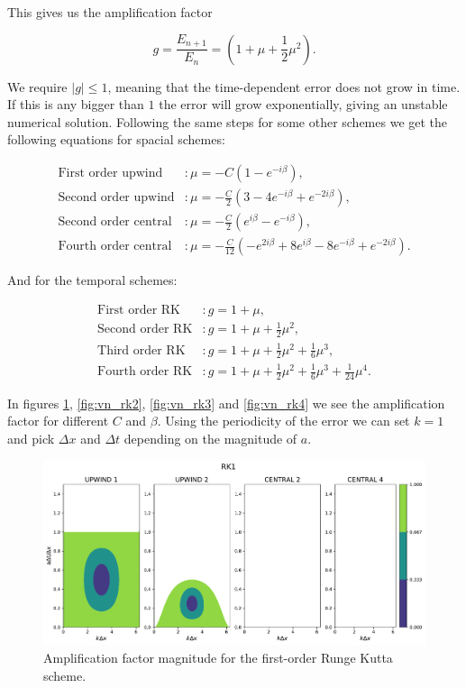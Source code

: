 \documentclass{article}
\begin{document}
This gives us the amplification factor 

\begin{equation}
    g = \frac{E_{n+1}}{E_n} = \left( 1 + \mu + \frac{1}{2}\mu^2  \right).
\end{equation}

We require $|g|\leq 1$, meaning that the time-dependent error does not grow in time. If this is any bigger than $1$ the error will grow exponentially, giving an unstable numerical solution. Following the same steps for some other schemes we get the following equations for spacial schemes:

\begin{align*}
    \text{First order upwind} &: \mu=-C\left(1-e^{-i\beta}\right),\\
    \text{Second order upwind} &: \mu=-\frac{C}{2}\left(3-4e^{-i\beta}+e^{-2i\beta}\right),\\
    \text{Second order central} &: \mu = -\frac{C}{2}\left(e^{i\beta} - e^{-i\beta}\right),\\
    \text{Fourth order central} &: \mu = - \frac{C}{12}\left(-e^{2i\beta}+8e^{i\beta}-8e^{-i\beta}+e^{-2i\beta}\right).
\end{align*}

And for the temporal schemes:

\begin{align*}
    \text{First order RK} &: g = 1+\mu,\\
    \text{Second order RK} &: g = 1+\mu + \frac{1}{2}\mu^2,\\
    \text{Third order RK} &: g = 1+\mu + \frac{1}{2}\mu^2+\frac{1}{6}\mu^3,\\
    \text{Fourth order RK} &: g = 1+\mu + \frac{1}{2}\mu^2+\frac{1}{6}\mu^3+\frac{1}{24}\mu^4.
\end{align*}

In figures \ref{fig:vn_rk1}, \ref{fig:vn_rk2}, \ref{fig:vn_rk3} and \ref{fig:vn_rk4} we see the amplification factor for different $C$ and $\beta$. Using the periodicity of the error we can set $k=1$ and pick $\Delta x$ and $\Delta t$ depending on the magnitude of $a$.

\begin{figure}[htbp]
    \centering
    \includegraphics[width=0.8\linewidth]{./vn_rk1.pdf} %
    \caption{Amplification factor magnitude for the first-order Runge Kutta scheme.}
    \label{fig:vn_rk1} %
\end{figure}
\end{document}
